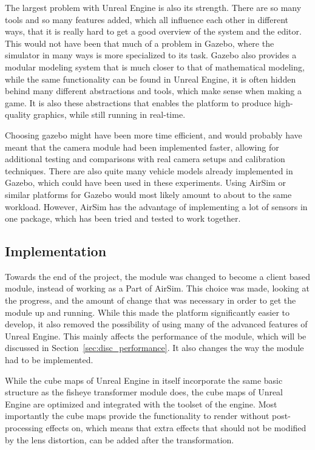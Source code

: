 The largest problem with Unreal Engine is also its strength. There are so many tools and so many features added, which all influence each other in different ways, that it is really hard to get a good overview of the system and the editor. This would not have been that much of a problem in Gazebo, where the simulator in many ways is more specialized to its task. Gazebo also provides a modular modeling system that is much closer to that of mathematical modeling, while the same functionality can be found in Unreal Engine, it is often hidden behind many different abstractions and tools, which make sense when making a game. It is also these abstractions that enables the platform to produce high-quality graphics, while still running in real-time.

Choosing gazebo might have been more time efficient, and would probably have meant that the camera module had been implemented faster, allowing for additional testing and comparisons with real camera setups and calibration techniques. There are also quite many vehicle models already implemented in Gazebo, which could have been used in these experiments. Using AirSim or similar platforms for Gazebo would most likely amount to about to the same workload. However, AirSim has the advantage of implementing a lot of sensors in one package, which has been tried and tested to work together.

\subsection{Implementation}

Towards the end of the project, the module was changed to become a client based module, instead of working as a Part of AirSim. This choice was made, looking at the progress, and the amount of change that was necessary in order to get the module up and running. While this made the platform significantly easier to develop, it also removed the possibility of using many of the advanced features of Unreal Engine. This mainly affects the performance of the module, which will be discussed in Section~\ref{sec:disc_performance}. It also changes the way the module had to be implemented.

While the cube maps of Unreal Engine in itself incorporate the same basic structure as the fisheye transformer module does, the cube maps of Unreal Engine are optimized and integrated with the toolset of the engine. Most importantly the cube maps provide the functionality to render without post-processing effects on, which means that extra effects that should not be modified by the lens distortion, can be added after the transformation.

